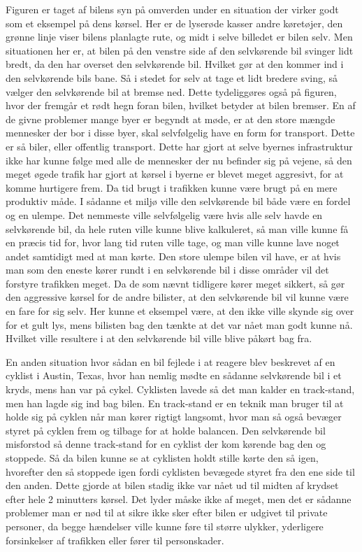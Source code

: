 Figuren er taget af bilens syn på omverden under en situation der virker godt som et eksempel på dens kørsel. Her er de lyserøde kasser andre køretøjer, den grønne linje viser bilens planlagte rute, og midt i selve billedet er bilen selv. Men situationen her er, at bilen på den venstre side af den selvkørende bil svinger lidt bredt, da den har overset den selvkørende bil. Hvilket gør at den kommer ind i den selvkørende bils bane. Så i stedet for selv at tage et lidt bredere sving, så vælger den selvkørende bil at bremse ned. Dette tydeliggøres også på figuren, hvor der fremgår et rødt hegn foran bilen, hvilket betyder at bilen bremser\cite{Backchannel}. En af de givne problemer mange byer er begyndt at møde, er at den store mængde mennesker der bor i disse byer, skal selvfølgelig have en form for transport. Dette er så biler, eller offentlig transport. Dette har gjort at selve byernes infrastruktur ikke har kunne følge med alle de mennesker der nu befinder sig på vejene, så den meget øgede trafik har gjort at kørsel i byerne er blevet meget aggresivt, for at komme hurtigere frem. Da tid brugt i trafikken kunne være brugt på en mere produktiv måde\cite{Michelin}. I sådanne et miljø ville den selvkørende bil både være en fordel og en ulempe. Det nemmeste ville selvfølgelig være hvis alle selv havde en selvkørende bil, da hele ruten ville kunne blive kalkuleret, så man ville kunne få en præcis tid for, hvor lang tid ruten ville tage, og man ville kunne lave noget andet samtidigt med at man kørte. Den store ulempe bilen vil have, er at hvis man som den eneste kører rundt i en selvkørende bil i disse områder vil det forstyre trafikken meget. Da de som nævnt tidligere kører meget sikkert, så gør den aggressive kørsel for de andre bilister, at den selvkørende bil vil kunne være en fare for sig selv. Her kunne et eksempel være, at den ikke ville skynde sig over for et gult lys, mens bilisten bag den tænkte at det var nået man godt kunne nå. Hvilket ville resultere i at den selvkørende bil ville blive påkørt bag fra.

En anden situation hvor sådan en bil fejlede i at reagere blev beskrevet af en cyklist i Austin, Texas, hvor han nemlig mødte en sådanne selvkørende bil i et kryds, mens han var på cykel. Cyklisten lavede så det man kalder en track-stand, men han lagde sig ind bag bilen. En track-stand er en teknik man bruger til at holde sig på cyklen når man kører rigtigt langsomt, hvor man så også bevæger styret på cyklen frem og tilbage for at holde balancen. Den selvkørende bil misforstod så denne track-stand for en cyklist der kom kørende bag den og stoppede. Så da bilen kunne se at cyklisten holdt stille kørte den så igen, hvorefter den så stoppede igen fordi cyklisten bevægede styret fra den ene side til den anden. Dette gjorde at bilen stadig ikke var nået ud til midten af krydset efter hele 2 minutters kørsel\cite{VOX}. Det lyder måske ikke af meget, men det er sådanne problemer man er nød til at sikre ikke sker efter bilen er udgivet til private personer, da begge hændelser ville kunne føre til større ulykker, yderligere forsinkelser af trafikken eller fører til personskader. 